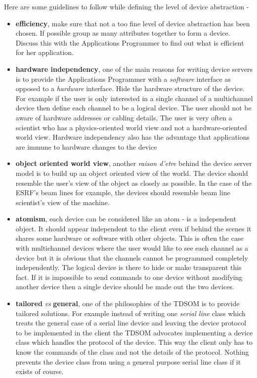 Here are some guidelines to follow while defining the level of device
abstraction - 
\begin{itemize}
\item \textbf{efficiency}, make sure that not a too fine level of device
abstraction has been chosen. If possible group as many attributes
together to form a device. Discuss this with the Applications Programmer
to find out what is efficient for her application.
\item \textbf{hardware independency}, one of the main reasons for writing
device servers is to provide the Applications Programmer with a \emph{software}
interface as opposed to a \emph{hardware} interface. Hide the hardware
structure of the device. For example if the user is only interested
in a single channel of a multichannel device then define each channel
to be a logical device. The user should not be aware of hardware addresses
or cabling details. The user is very often a scientist who has a physics-oriented
world view and not a hardware-oriented world view. Hardware independency
also has the advantage that applications are immune to hardware changes
to the device 
\item \textbf{object oriented world view}, another \emph{raison d'etre}
behind the device server model is to build up an object oriented view
of the world. The device should resemble the user's view of the object
as closely as possible. In the case of the ESRF's beam lines for example,
the devices should resemble beam line scientist's view of the machine. 
\item \textbf{atomism}, each device can be considered like an atom - is
a independent object. It should appear independent to the client even
if behind the scenes it shares some hardware or software with other
objects. This is often the case with multichannel devices where the
user would like to see each channel as a device but it is obvious
that the channels cannot be programmed completely independently. The
logical device is there to hide or make transparent this fact. If
it is impossible to send commands to one device without modifying
another device then a single device should be made out the two devices. 
\item \textbf{tailored} \emph{vs} \textbf{general}, one of the philosophies
of the TDSOM is to provide tailored solutions. For example instead
of writing one \emph{serial line} class which treats the general case
of a serial line device and leaving the device protocol to be implemented
in the client the TDSOM advocates implementing a device class which
handles the protocol of the device. This way the client only has to
know the commands of the class and not the details of the protocol.
Nothing prevents the device class from using a general purpose serial
line class if it exists of course.
\end{itemize}

